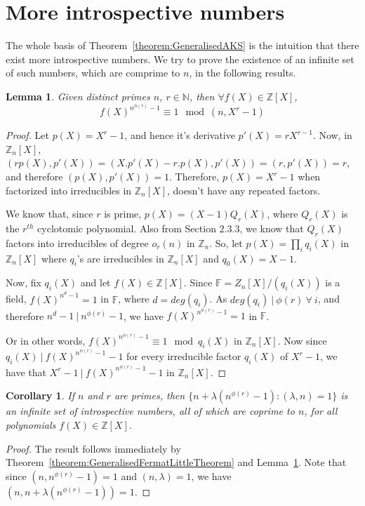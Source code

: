 \documentclass[11pt]{report}
\newtheorem{corollary}{Corollary}[theorem]
\newtheorem{lemma}[theorem]{Lemma}
\begin{document}
\section{More introspective numbers}
The whole basis of Theorem~\ref{theorem:GeneralisedAKS} is the intuition that there exist more introspective numbers. We try to prove the existence of an infinite set of such numbers, which are comprime to $n$, in the following results.

\begin{lemma}
\label{lemma:MoreIntrospectiveNumbers}
Given distinct primes $n$, $r \in \mathbb{N}$, then $\forall f(X) \in \mathbb{Z}[X]$,
\[f(X)^{n^{\phi(r)}-1} \equiv 1 \mod (n, X^r - 1)\]
\end{lemma}
\begin{proof}
Let $p(X) = X^r - 1$, and hence it's derivative $p'(X) = rX^{r-1}$. Now, in $\mathbb{Z}_n[X]$, $(rp(X), p'(X)) = (X.p'(X)-r.p(X), p'(X)) = (r, p'(X)) = r$, and therefore $(p(X), p'(X)) = 1$. Therefore, $p(X) = X^r - 1$ when factorized into irreducibles in $\mathbb{Z}_n[X]$, doesn't have any repeated factors.

We know that, since $r$ is prime, $p(X) = (X-1)Q_r(X)$, where $Q_r(X)$ is the $r^{th}$ cyclotomic polynomial. Also from Section $2.3.3$, we know that $Q_r(X)$ factors into irreducibles of degree $o_r(n)$ in $\mathbb{Z}_n$. So, let $p(X) = \prod_i q_i(X)$ in $\mathbb{Z}_n[X]$ where $q_i$'s are irreducibles in $\mathbb{Z}_n[X]$ and $q_0(X) = X-1$.

Now, fix $q_i(X)$ and let $f(X) \in \mathbb{Z}[X]$. Since $\mathbb{F} = Z_n[X]/(q_i(X))$ is a field, $f(X)^{n^d - 1} = 1$ in $\mathbb{F}$, where $d = deg(q_i)$. As $deg(q_i)\ |\ \phi(r)\ \forall\ i$, and therefore $n^d - 1\ |\ n^{\phi(r)} - 1$, we have $f(X)^{n^{\phi(r)} - 1} = 1$ in $\mathbb{F}$. 

Or in other words, $f(X)^{n^{\phi(r)} - 1} \equiv 1 \mod q_i(X)$ in $\mathbb{Z}_n[X]$. Now since $q_i(X)\ |\ f(X)^{n^{\phi(r)} - 1} - 1$ for every irreducible factor $q_i(X)$ of $X^r - 1$, we have that $X^r - 1\ |\ f(X)^{n^{\phi(r)} - 1} - 1$ in $\mathbb{Z}_n[X]$.
\end{proof}

\begin{corollary}
\label{corollary:MoreIntrospectiveNumbersCorollary}
If $n$ and $r$ are primes, then $\{n + \lambda (n^{\phi(r)} - 1): (\lambda, n) = 1 \}$ is an infinite set of introspective numbers, all of which are coprime to $n$, for all polynomials $f(X) \in \mathbb{Z}[X]$.
\end{corollary}
\begin{proof}
The result follows immediately by Theorem~\ref{theorem:GeneralisedFermatLittleTheorem} and Lemma~\ref{lemma:MoreIntrospectiveNumbers}. Note that since $(n, n^{\phi(r)} - 1) = 1$ and $(n, \lambda) = 1$, we have $(n, n + \lambda (n^{\phi(r)} - 1)) = 1$.
\end{proof}
\end{document}
